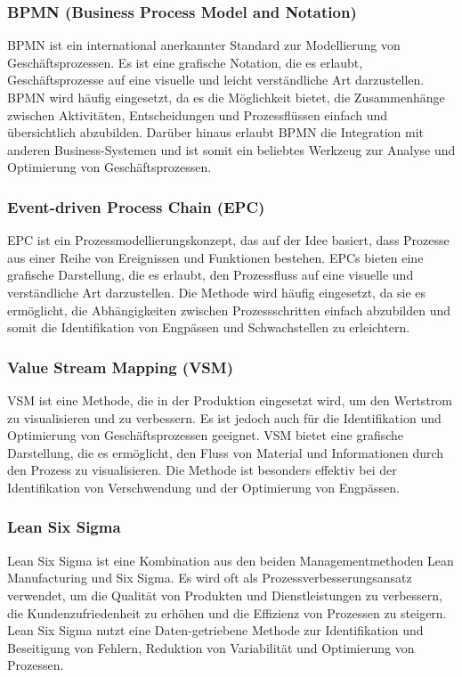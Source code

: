 \documentclass[11pt,a4paper]{scrartcl}
\begin{document}
\subsubsection{BPMN (Business Process Model and Notation)}

BPMN ist ein international anerkannter Standard zur Modellierung von Geschäftsprozessen.
Es ist eine grafische Notation, die es erlaubt, Geschäftsprozesse auf eine visuelle und leicht verständliche Art darzustellen.
BPMN wird häufig eingesetzt, da es die Möglichkeit bietet, die Zusammenhänge zwischen Aktivitäten, Entscheidungen und Prozessflüssen einfach und übersichtlich abzubilden.
Darüber hinaus erlaubt BPMN die Integration mit anderen Business-Systemen und ist somit ein beliebtes Werkzeug zur Analyse und Optimierung von Geschäftsprozessen.

\subsubsection{Event-driven Process Chain (EPC)}

EPC ist ein Prozessmodellierungskonzept, das auf der Idee basiert, dass Prozesse aus einer Reihe von Ereignissen und Funktionen bestehen.
EPCs bieten eine grafische Darstellung, die es erlaubt, den Prozessfluss auf eine visuelle und verständliche Art darzustellen.
Die Methode wird häufig eingesetzt, da sie es ermöglicht, die Abhängigkeiten zwischen Prozessschritten einfach abzubilden und somit die Identifikation von Engpässen und Schwachstellen zu erleichtern.

\subsubsection{Value Stream Mapping (VSM)}

VSM ist eine Methode, die in der Produktion eingesetzt wird, um den Wertstrom zu visualisieren und zu verbessern.
Es ist jedoch auch für die Identifikation und Optimierung von Geschäftsprozessen geeignet.
VSM bietet eine grafische Darstellung, die es ermöglicht, den Fluss von Material und Informationen durch den Prozess zu visualisieren.
Die Methode ist besonders effektiv bei der Identifikation von Verschwendung und der Optimierung von Engpässen.

\subsubsection{Lean Six Sigma}

Lean Six Sigma ist eine Kombination aus den beiden Managementmethoden Lean Manufacturing und Six Sigma.
Es wird oft als Prozessverbesserungsansatz verwendet, um die Qualität von Produkten und Dienstleistungen zu verbessern, die Kundenzufriedenheit zu erhöhen und die Effizienz von Prozessen zu steigern.
Lean Six Sigma nutzt eine Daten-getriebene Methode zur Identifikation und Beseitigung von Fehlern, Reduktion von Variabilität und Optimierung von Prozessen.\\
\end{document}
